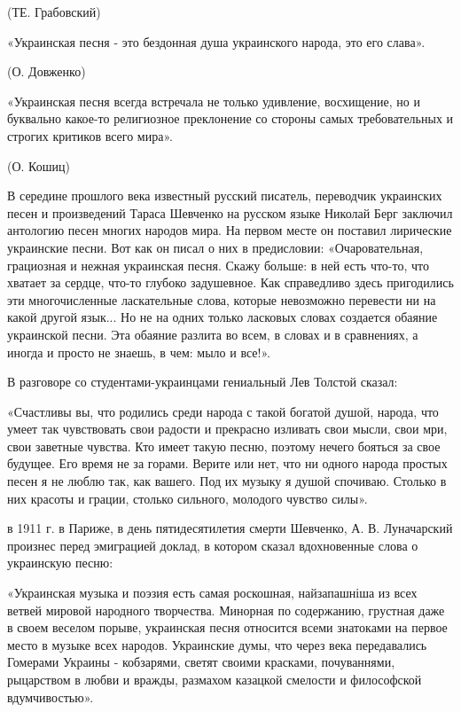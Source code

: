 (ТЕ. Грабовский)



«Украинская песня - это бездонная душа украинского народа, это его слава».



(О. Довженко)



«Украинская песня всегда встречала не только удивление, восхищение, но и буквально какое-то религиозное преклонение со стороны самых требовательных и строгих критиков всего мира».



(О. Кошиц)



В середине прошлого века известный русский писатель, переводчик украинских песен и произведений Тараса Шевченко на русском языке Николай Берг заключил антологию песен многих народов мира. На первом месте он поставил лирические украинские песни. Вот как он писал о них в предисловии: «Очаровательная, грациозная и нежная украинская песня. Скажу больше: в ней есть что-то, что хватает за сердце, что-то глубоко задушевное. Как справедливо здесь пригодились эти многочисленные ласкательные слова, которые невозможно перевести ни на какой другой язык... Но не на одних только ласковых словах создается обаяние украинской песни. Эта обаяние разлита во всем, в словах и в сравнениях, а иногда и просто не знаешь, в чем: мыло и все!».



В разговоре со студентами-украинцами гениальный Лев Толстой сказал:



«Счастливы вы, что родились среди народа с такой богатой душой, народа, что умеет так чувствовать свои радости и прекрасно изливать свои мысли, свои мри, свои заветные чувства. Кто имеет такую песню, поэтому нечего бояться за свое будущее. Его время не за горами. Верите или нет, что ни одного народа простых песен я не люблю так, как вашего. Под их музыку я душой спочиваю. Столько в них красоты и грации, столько сильного, молодого чувство силы».



в 1911 г. в Париже, в день пятидесятилетия смерти Шевченко, А. В. Луначарский произнес перед эмиграцией доклад, в котором сказал вдохновенные слова о украинскую песню:



«Украинская музыка и поэзия есть самая роскошная, найзапашніша из всех ветвей мировой народного творчества. Минорная по содержанию, грустная даже в своем веселом порыве, украинская песня относится всеми знатоками на первое место в музыке всех народов. Украинские думы, что через века передавались Гомерами Украины - кобзарями, светят своими красками, почуваннями, рыцарством в любви и вражды, размахом казацкой смелости и философской вдумчивостью».



